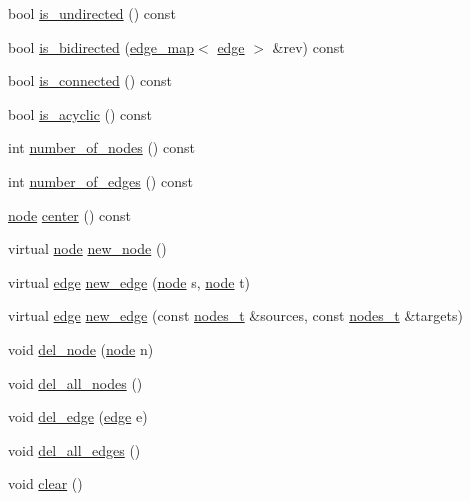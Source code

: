 \begin{DoxyCompactItemize}
\item 
bool \mbox{\hyperlink{classgraph_aba427ff8ba0f70c68416ec1351344cd8}{is\+\_\+undirected}} () const
\item 
bool \mbox{\hyperlink{classgraph_a8014a8073dd640c91cbd4fc1fb6e6071}{is\+\_\+bidirected}} (\mbox{\hyperlink{classedge__map}{edge\+\_\+map}}$<$ \mbox{\hyperlink{classedge}{edge}} $>$ \&rev) const
\item 
bool \mbox{\hyperlink{classgraph_a599e2bf967df8a2052a9892c94db98b7}{is\+\_\+connected}} () const
\item 
bool \mbox{\hyperlink{classgraph_a9b500cb72826fe5bbefa8c71bc4642fa}{is\+\_\+acyclic}} () const
\item 
int \mbox{\hyperlink{classgraph_a42c78e0a9f115655e3ff0efe35ebfc4e}{number\+\_\+of\+\_\+nodes}} () const
\item 
int \mbox{\hyperlink{classgraph_aa4fcbe7bf572dc800068873ccfb4d95a}{number\+\_\+of\+\_\+edges}} () const
\item 
\mbox{\hyperlink{classnode}{node}} \mbox{\hyperlink{classgraph_a351617e023b4b6833ab650a70fc086e7}{center}} () const
\item 
virtual \mbox{\hyperlink{classnode}{node}} \mbox{\hyperlink{classgraph_ab9505335c20558319b6cce25aed23524}{new\+\_\+node}} ()
\item 
virtual \mbox{\hyperlink{classedge}{edge}} \mbox{\hyperlink{classgraph_a02a0c3a219f75d68caa408ef339d4a1c}{new\+\_\+edge}} (\mbox{\hyperlink{classnode}{node}} s, \mbox{\hyperlink{classnode}{node}} t)
\item 
virtual \mbox{\hyperlink{classedge}{edge}} \mbox{\hyperlink{classgraph_a2ae550efa58c48056d5df22ed26c5c6c}{new\+\_\+edge}} (const \mbox{\hyperlink{edge_8h_a22ac17689106ba21a84e7bc54d1199d6}{nodes\+\_\+t}} \&sources, const \mbox{\hyperlink{edge_8h_a22ac17689106ba21a84e7bc54d1199d6}{nodes\+\_\+t}} \&targets)
\item 
void \mbox{\hyperlink{classgraph_a8bdc09d5b9ac4bd26586b054d8fcbe91}{del\+\_\+node}} (\mbox{\hyperlink{classnode}{node}} n)
\item 
void \mbox{\hyperlink{classgraph_ad0ca1578643a51f96a76a846f14558df}{del\+\_\+all\+\_\+nodes}} ()
\item 
void \mbox{\hyperlink{classgraph_ad9356508c49c542dfd4b7169297387c6}{del\+\_\+edge}} (\mbox{\hyperlink{classedge}{edge}} e)
\item 
void \mbox{\hyperlink{classgraph_aae52be443c5aef001b5f6758855f15ad}{del\+\_\+all\+\_\+edges}} ()
\item 
void \mbox{\hyperlink{classgraph_a9ff5d6af3653e79f87b836701453f55a}{clear}} ()

\end{DoxyCompactItemize}
